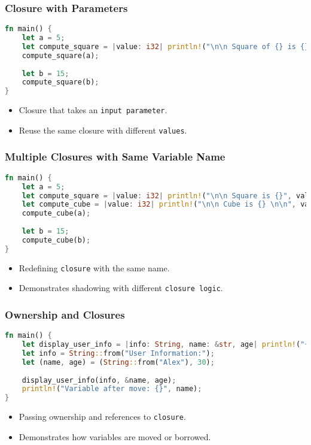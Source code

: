 \documentclass[aspectratio=169, table]{beamer}
\begin{document}
\begin{frame}[fragile]
\frametitle{Closure with Parameters}
\begin{lstlisting}[language=Rust]
fn main() {
	let a = 5;
	let compute_square = |value: i32| println!("\n\n Square of {} is {} \n\n", value, value * value);
	compute_square(a);
	
	let b = 15;
	compute_square(b);
}
\end{lstlisting}
\begin{itemize}
\item Closure that takes an \texttt{input\ parameter}.
\item Reuse the same closure with different \texttt{values}.
\end{itemize}
\end{frame}

\begin{frame}[fragile]
\frametitle{Multiple Closures with Same Variable Name}
\begin{lstlisting}[language=Rust]
fn main() {
	let a = 5;
	let compute_square = |value: i32| println!("\n\n Square is {}", value * value);
	let compute_cube = |value: i32| println!("\n\n Cube is {} \n\n", value * value * value);
	compute_cube(a);
	
	let b = 15;
	compute_cube(b);
}
\end{lstlisting}
\begin{itemize}
\item Redefining \texttt{closure} with the same name.
\item Demonstrates shadowing with different \texttt{closure\ logic}.
\end{itemize}
\end{frame}

\begin{frame}[fragile]
\frametitle{Ownership and Closures}
\begin{lstlisting}[language=Rust]
fn main() {
	let display_user_info = |info: String, name: &str, age| println!("{}\n\t{}: {}", info, name, age);
	let info = String::from("User Information:");
	let (name, age) = (String::from("Alex"), 30);
	
	display_user_info(info, &name, age);
	println!("Variable after move: {}", name);
}
\end{lstlisting}
\begin{itemize}
\item Passing ownership and references to \texttt{closure}.
\item Demonstrates how variables are moved or borrowed.
\end{itemize}
\end{frame}
\end{document}
